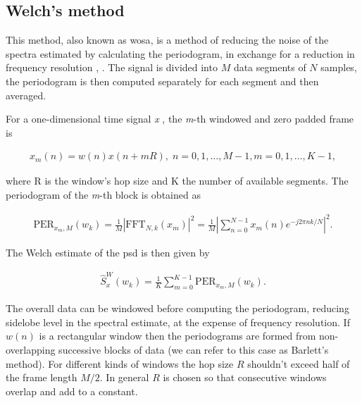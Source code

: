 	
	\subsection{Welch's method}
	
	This method, also known as \gls{wosa}, is a method of reducing the noise of the spectra estimated by calculating the periodogram, in exchange for a reduction in frequency resolution \cite{Welch_period}, \cite{Spagnolini_ch14}.
	The signal is divided into $M$ data segments of $N$ samples, the periodogram is then computed separately for each segment and then averaged.
	
	For a one-dimensional time signal \textit{x} \cite{SASPWEB2011}, the \textit{m}-th windowed and zero padded frame is
	
	\begin{align*}
		x_m(n) = w(n)x(n + mR), \; n=0,1,\ldots, M-1, m=0,1,\ldots, K-1,
	\end{align*}
	
	where R is the window's hop size and K the number of available segments. The periodogram of the \textit{m}-th block is obtained as
	
	\begin{align*}
		\text{PER}_{x_m,M}(w_k) = \frac{1}{M} |\text{FFT}_{N,k}(x_m)|^2 = \frac{1}{M}\left|\sum_{n=0}^{N-1}x_m(n)e^{-j2\pi nk/N}\right|^2.
	\end{align*}
	
	The Welch estimate of the \gls{psd} is then given by
	
	\begin{align*}
		\hat{S}^W_x(w_k) = \frac{1}{K}\sum_{m=0}^{K-1}\text{PER}_{x_m,M}(w_k).
	\end{align*}
	
	The overall data can be windowed before computing the periodogram, reducing sidelobe level in the spectral estimate, at the expense of frequency resolution. If $w(n)$ is a rectangular window then the periodograms are formed from non-overlapping successive blocks of data (we can refer to this case as Barlett's method). For different kinds of windows the hop size $R$ shouldn't exceed half of the frame length $M/2$. In general $R$ is chosen so that consecutive windows overlap and add to a constant.
	
	
	

	

    
    
    